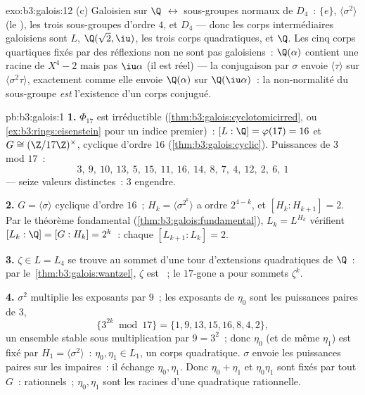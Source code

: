 \begin{solution}{exo:b3:galois:12}
(c) Galoisien sur $\Q$ $\leftrightarrow$ sous-groupes normaux
de $D_4$~: $\{e\}$, $\langle\sigma^2\rangle$ (le ), les
trois sous-groupes d'ordre $4$, et $D_4$ --- donc les corps
intermédiaires galoisiens sont $L$, $\Q(\sqrt2, \iu)$, les
trois corps quadratiques, et $\Q$. Les cinq corps quartiques
fixés par des réflexions non  ne sont pas
galoisiens~: $\Q(\alpha)$ contient une racine de $X^4 - 2$
mais pas $\iu\alpha$ (il est réel) --- la conjugaison par
$\sigma$ envoie $\langle\tau\rangle$ sur
$\langle\sigma^2\tau\rangle$, exactement comme elle envoie
$\Q(\alpha)$ sur $\Q(\iu\alpha)$~: la non-normalité du
sous-groupe \emph{est} l'existence d'un corps conjugué.
\end{solution}

\begin{solution}{pb:b3:galois:1}
\textbf{1.} $\Phi_{17}$ est irréductible
(\cref{thm:b3:galois:cyclotomicirred}, ou
\cref{ex:b3:rings:eisenstein} pour un indice premier)~: $[L:\Q]
= \varphi(17) = 16$ et $G \cong (\Z/17\Z)^\times$, cyclique
d'ordre $16$ (\cref{thm:b3:galois:cyclic}). Puissances de $3$
mod $17$~:
\[
3,\ 9,\ 10,\ 13,\ 5,\ 15,\ 11,\ 16,\ 14,\ 8,\ 7,\ 4,\ 12,\ 2,\
6,\ 1
\]
--- seize valeurs distinctes~: $3$ engendre.

\textbf{2.} $G = \langle\sigma\rangle$ cyclique d'ordre $16$~;
$H_k = \langle\sigma^{2^k}\rangle$ a ordre $2^{4-k}$, et
$[H_k : H_{k+1}] = 2$. Par le théorème fondamental
(\cref{thm:b3:galois:fundamental}), $L_k = L^{H_k}$ vérifient
$[L_k : \Q] = [G : H_k] = 2^k$~: chaque $[L_{k+1}:L_k] = 2$.

\textbf{3.} $\zeta \in L = L_4$ se trouve au sommet d'une tour
d'extensions quadratiques de $\Q$~: par
le~\cref{thm:b3:galois:wantzel}, $\zeta$ est ~; le
$17$-gone a pour sommets $\zeta^k$.

\textbf{4.} $\sigma^2$ multiplie les exposants par $9$~; les
exposants de $\eta_0$ sont les puissances paires de $3$,
\[
\{3^{2k} \bmod 17\} = \{1, 9, 13, 15, 16, 8, 4, 2\},
\]
un ensemble stable sous multiplication par $9 = 3^2$~; donc
$\eta_0$ (et de même $\eta_1$) est fixé par $H_1 =
\langle\sigma^2\rangle$~: $\eta_0, \eta_1 \in L_1$, un corps
quadratique. $\sigma$ envoie les puissances paires sur les
impaires~: il échange $\eta_0, \eta_1$. Donc $\eta_0 + \eta_1$
et $\eta_0\eta_1$ sont fixés par tout $G$~: rationnels~;
$\eta_0, \eta_1$ sont les racines d'une quadratique
rationnelle.


\end{solution}
